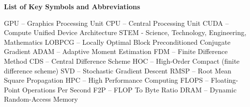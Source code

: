\noindent
\begingroup
    \fontsize{12pt}{1.5pt}\selectfont
    \textbf{List of Key Symbols and Abbreviations}
\endgroup

\vspace{3mm}

\noindent GPU -- Graphics Processing Unit\newline
CPU -- Central Processing Unit\newline
CUDA -- Compute Unified Device Architecture\newline
STEM - Science, Technology, Engineering, Mathematics\newline
LOBPCG -- Locally Optimal Block Preconditioned Conjugate Gradient\newline
ADAM -- Adaptive Moment Estimation\newline
FDM -- Finite Difference Method\newline
CDS -- Central Difference Scheme\newline
HOC -- High-Order Compact (finite difference scheme)\newline
SVD -- Stochastic Gradient Descent \newline
RMSP -- Root Mean Square Propagation\newline
HPC -- High Performance Computing\newline
FLOPS -- Floating-Point Operations Per Second\newline
F2P -- FLOP To Byte Ratio\newline
DRAM -- Dynamic Random-Access Memory




